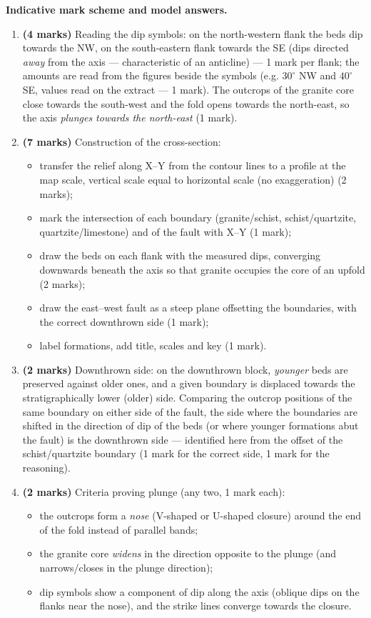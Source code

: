 \documentclass[11pt]{article}
\begin{document}
\begin{corrige}
\textbf{Indicative mark scheme and model answers.}
\begin{enumerate}
\item \textbf{(4 marks)} Reading the dip symbols: on the north-western flank the beds dip towards the NW, on the south-eastern flank towards the SE (dips directed \emph{away} from the axis — characteristic of an anticline) — 1 mark per flank; the amounts are read from the figures beside the symbols (e.g. $30^{\circ}$ NW and $40^{\circ}$ SE, values read on the extract — 1 mark). The outcrops of the granite core close towards the south-west and the fold opens towards the north-east, so the axis \emph{plunges towards the north-east} (1 mark).
\item \textbf{(7 marks)} Construction of the cross-section:
\begin{itemize}
\item transfer the relief along X--Y from the contour lines to a profile at the map scale, vertical scale equal to horizontal scale (no exaggeration) (2 marks);
\item mark the intersection of each boundary (granite/schist, schist/quartzite, quartzite/limestone) and of the fault with X--Y (1 mark);
\item draw the beds on each flank with the measured dips, converging downwards beneath the axis so that granite occupies the core of an upfold (2 marks);
\item draw the east--west fault as a steep plane offsetting the boundaries, with the correct downthrown side (1 mark);
\item label formations, add title, scales and key (1 mark).
\end{itemize}
\item \textbf{(2 marks)} Downthrown side: on the downthrown block, \emph{younger} beds are preserved against older ones, and a given boundary is displaced towards the stratigraphically lower (older) side. Comparing the outcrop positions of the same boundary on either side of the fault, the side where the boundaries are shifted in the direction of dip of the beds (or where younger formations abut the fault) is the downthrown side — identified here from the offset of the schist/quartzite boundary (1 mark for the correct side, 1 mark for the reasoning).
\item \textbf{(2 marks)} Criteria proving plunge (any two, 1 mark each):
\begin{itemize}
\item the outcrops form a \emph{nose} (V-shaped or U-shaped closure) around the end of the fold instead of parallel bands;
\item the granite core \emph{widens} in the direction opposite to the plunge (and narrows/closes in the plunge direction);
\item dip symbols show a component of dip along the axis (oblique dips on the flanks near the nose), and the strike lines converge towards the closure.
\end{itemize}
\end{enumerate}
\end{corrige}
\end{document}
